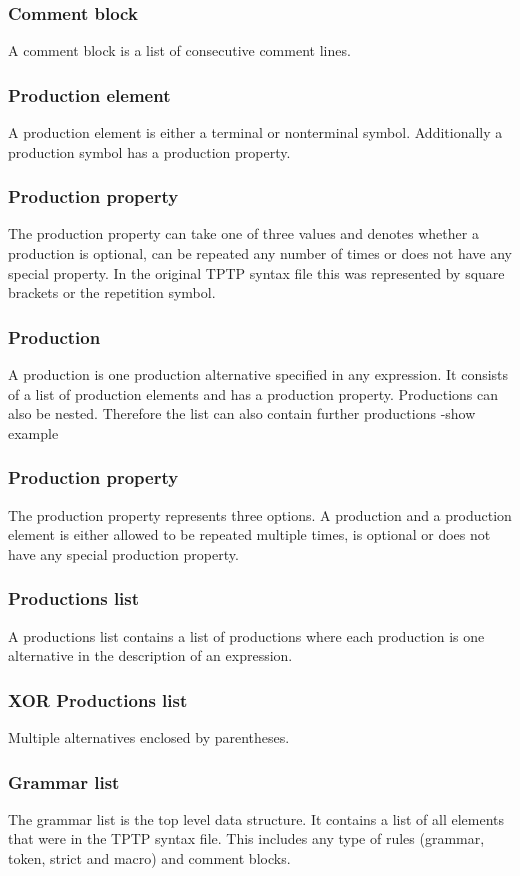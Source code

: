 \subsubsection{Comment block}
A comment block is a list of consecutive comment lines.

\subsubsection{Production element}
A production element is either a terminal or nonterminal symbol. Additionally a production symbol has a production property.
\subsubsection{Production property}
The production property can take one of three values and denotes whether a production is optional, can be repeated any number of times or does not have any special property. In the original \ac{TPTP} syntax file this was represented by square brackets or the repetition symbol.
\subsubsection{Production}
A production is one production alternative specified in any expression. It consists of a list of production elements and has a production property. Productions can also be nested. Therefore the list can also contain further productions
-show example
\subsubsection{Production property}
The production property represents three options. A production and a production element is either allowed to be repeated multiple times, is optional or does not have any special production property.
\subsubsection{Productions list}
A productions list contains a list of productions where each production is one alternative in the description of an expression.
\subsubsection{XOR Productions list}
Multiple alternatives enclosed by parentheses.

\subsubsection{Grammar list}
The grammar list is the top level data structure. It contains a list of all elements that were in the \ac{TPTP} syntax file. This includes any type of rules (grammar, token, strict and macro) and comment blocks.

